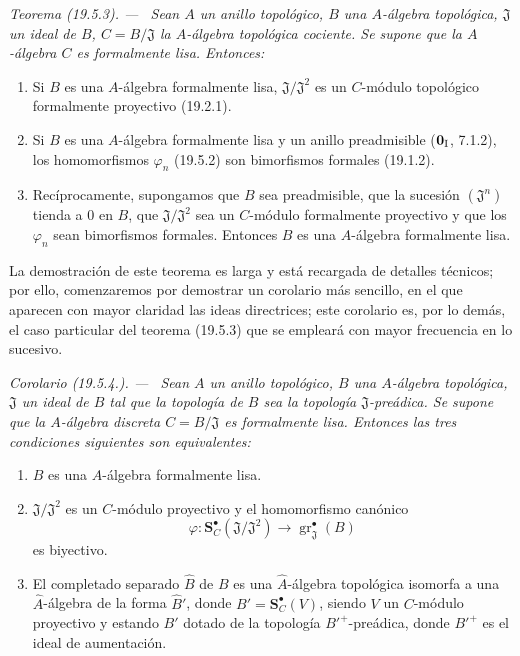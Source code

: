 \documentclass[10pt,oneside]{book}
\makeatletter
\newcommand{\gr}{\operatorname{gr}}
\newcommand{\setmanualcurrentlabel}[1]{\def\@currentlabel{#1}}
\newenvironment{theorem}[1][]{%
  \setmanualcurrentlabel{#1}\par\medskip\noindent\itshape Teorema (#1). ---\ }{\par}
\newenvironment{corollary}[1][]{%
  \setmanualcurrentlabel{#1}\par\medskip\noindent\itshape Corolario (#1). ---\ }{\par}
\makeatother
\begin{document}
\begin{theorem}[19.5.3]
\label{0.19.5.3-es}
Sean $A$ un anillo topológico, $B$ una $A$-álgebra topológica,
$\mathfrak J$ un ideal de $B$, $C=B/\mathfrak J$ la $A$-álgebra topológica
cociente. Se supone que la $A$-álgebra $C$ es formalmente lisa.
Entonces:
\begin{enumerate}
  \item[\rm(i)] Si $B$ es una $A$-álgebra formalmente lisa,
  $\mathfrak J/\mathfrak J^2$ es un $C$-módulo topológico formalmente
  proyectivo \textup{(19.2.1)}.
  \item[\rm(ii)] Si $B$ es una $A$-álgebra formalmente lisa y un anillo
  preadmisible \textup{($\mathbf 0_{\rm I}$, 7.1.2)}, los homomorfismos $\varphi_n$
  \textup{(19.5.2)} son bimorfismos formales \textup{(19.1.2)}.
  \item[\rm(iii)] Recíprocamente, supongamos que $B$ sea preadmisible, que la
  sucesión $(\mathfrak J^n)$ tienda a $0$ en $B$, que
  $\mathfrak J/\mathfrak J^2$ sea un $C$-módulo formalmente proyectivo y que
  los $\varphi_n$ sean bimorfismos formales. Entonces $B$ es una
  $A$-álgebra formalmente lisa.
\end{enumerate}
\end{theorem}

La demostración de este teorema es larga y está recargada de detalles técnicos;
por ello, comenzaremos por demostrar un corolario más sencillo, en el que
aparecen con mayor claridad las ideas directrices; este corolario es, por lo demás,
el caso particular del teorema (19.5.3) que se empleará con mayor frecuencia
en lo sucesivo.

\begin{corollary}[19.5.4.]
\label{0.19.5.4-es}
Sean $A$ un anillo topológico, $B$ una $A$-álgebra topológica,
$\mathfrak J$ un ideal de $B$ tal que la topología de $B$ sea la topología
$\mathfrak J$-preádica. Se supone que la $A$-álgebra discreta
$C=B/\mathfrak J$ es formalmente lisa. Entonces las tres condiciones siguientes
son equivalentes:
\begin{enumerate}
  \item[\textup{a)}] $B$ es una $A$-álgebra formalmente lisa.
  \item[\textup{b)}] $\mathfrak J/\mathfrak J^2$ es un $C$-módulo proyectivo y
  el homomorfismo canónico
  \[
    \varphi:\mathbf S_C^\bullet(\mathfrak J/\mathfrak J^2)
    \longrightarrow\gr_{\mathfrak J}^\bullet(B)
  \]
  es biyectivo.
  \item[\textup{c)}] El completado separado $\widehat B$ de $B$ es una
  $\widehat A$-álgebra topológica isomorfa a una $\widehat A$-álgebra de la
  forma $\widehat B'$, donde $B'=\mathbf S_C^\bullet(V)$, siendo $V$ un $C$-módulo
  proyectivo y estando $B'$ dotado de la topología ${B'}^+$-preádica, donde
  ${B'}^+$ es el ideal de aumentación.
\end{enumerate}
\end{corollary}
\end{document}

